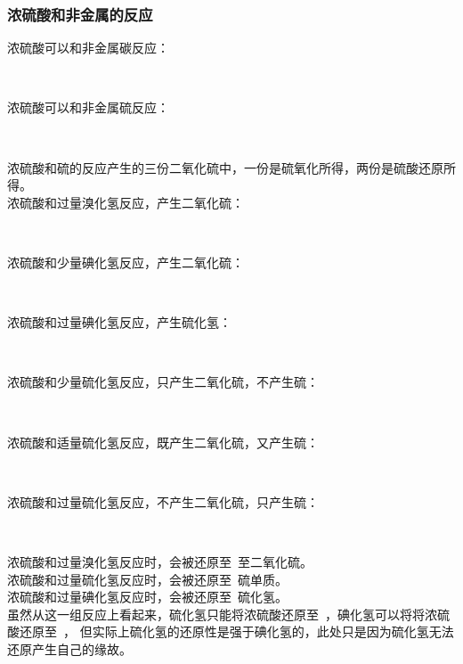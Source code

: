 \documentclass[UTF8]{ctexart}
\newcommand{\LiValence}[3]
{
    \overset{\texttt{\tiny #1}\text{\tiny #2}}{\ce{#3}}
}
\begin{document}
\newpage

\subsubsection{浓硫酸和非金属的反应}
    浓硫酸可以和非金属碳反应：
    \begin{center}
        \\[6mm]
    \end{center}
    浓硫酸可以和非金属硫反应：
    \begin{center}
        \\[6mm]
    \end{center}
    浓硫酸和硫的反应产生的三份二氧化硫中，一份是硫氧化所得，两份是硫酸还原所得。\\[12mm]
    浓硫酸和过量溴化氢反应，产生二氧化硫：
    \begin{center}
        ~\\[6mm]
    \end{center}
    浓硫酸和少量碘化氢反应，产生二氧化硫：
    \begin{center}
        ~\\[6mm]
    \end{center}
    浓硫酸和过量碘化氢反应，产生硫化氢：
    \begin{center}
        ~~\\[6mm]
    \end{center}
    浓硫酸和少量硫化氢反应，只产生二氧化硫，不产生硫：
    \begin{center}
        \\[6mm]
    \end{center}
    浓硫酸和适量硫化氢反应，既产生二氧化硫，又产生硫：
    \begin{center}
        \\[6mm]
    \end{center}
    浓硫酸和过量硫化氢反应，不产生二氧化硫，只产生硫：
    \begin{center}
        \\[6mm]
    \end{center}
    浓硫酸和过量溴化氢反应时，会被还原至~\ce{$\LiValence{+}{4}{S}$}至二氧化硫。\\[3mm]
    浓硫酸和过量硫化氢反应时，会被还原至~\ce{$\LiValence{}{0}{S}$}硫单质。\\[3mm]
    浓硫酸和过量碘化氢反应时，会被还原至~\ce{$\LiValence{-}{2}{S}$}硫化氢。\\[3mm]
    虽然从这一组反应上看起来，硫化氢只能将浓硫酸还原至~\ce{$\LiValence{}{0}{S}$}，碘化氢可以将将浓硫酸还原至~\ce{$\LiValence{-}{2}{S}$}，
    但实际上硫化氢的还原性是强于碘化氢的，此处只是因为硫化氢无法还原产生自己的缘故。
\end{document}
